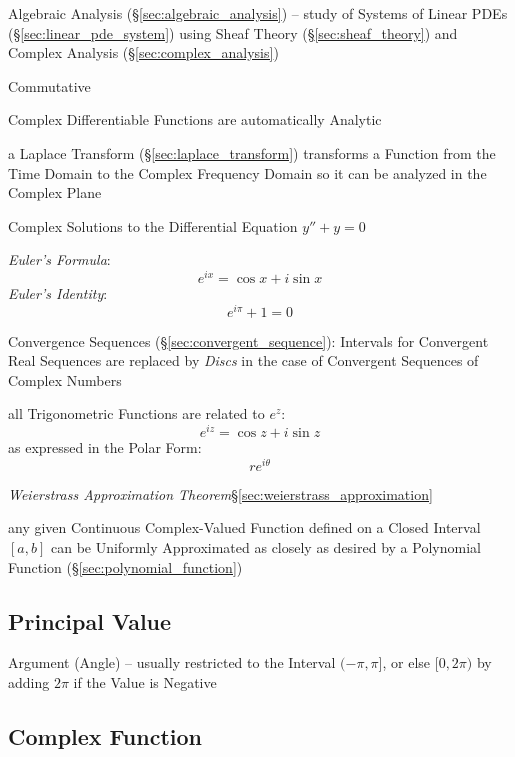 \fist Algebraic Analysis (\S\ref{sec:algebraic_analysis}) -- study of Systems of
Linear PDEs (\S\ref{sec:linear_pde_system}) using Sheaf Theory
(\S\ref{sec:sheaf_theory}) and Complex Analysis (\S\ref{sec:complex_analysis})

Commutative

Complex Differentiable Functions are automatically Analytic %

a Laplace Transform (\S\ref{sec:laplace_transform}) transforms a Function from
the Time Domain to the Complex Frequency Domain so it can be analyzed in the
Complex Plane

Complex Solutions to the Differential Equation $y'' + y = 0$

\emph{Euler's Formula}:
\[
  e^{ix} = \cos x + i \sin x
\]
\emph{Euler's Identity}:
\[
  e^{i\pi} + 1 = 0
\]

Convergence Sequences (\S\ref{sec:convergent_sequence}): Intervals
for Convergent Real Sequences are replaced by \emph{Discs} in the case of
Convergent Sequences of Complex Numbers

all Trigonometric Functions are related to $e^z$:
\[
  e^{iz} = \cos z + i \sin z
\]
as expressed in the Polar Form:
\[
  re^{i\theta}
\]


\emph{Weierstrass Approximation Theorem}\S\ref{sec:weierstrass_approximation}

any given Continuous Complex-Valued Function defined on a Closed Interval
$[a,b]$ can be Uniformly Approximated as closely as desired by a Polynomial
Function (\S\ref{sec:polynomial_function})



\subsection{Principal Value}\label{sec:principal_value}

Argument (Angle) -- usually restricted to the Interval $(-\pi,\pi]$, or else
$[0,2\pi)$ by adding $2\pi$ if the Value is Negative



\subsection{Complex Function}\label{sec:complex_function}

